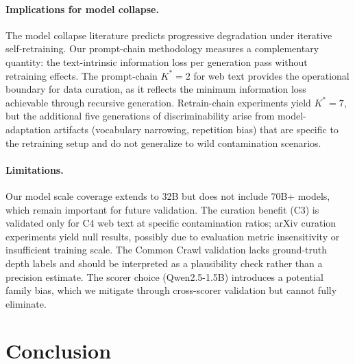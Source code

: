 \documentclass[11pt,a4paper]{article}
\newcommand{\kstar}{K^{*}}
\begin{document}
\paragraph{Implications for model collapse.}
The model collapse literature predicts progressive degradation under iterative self-retraining.
Our prompt-chain methodology measures a complementary quantity: the text-intrinsic information loss per generation pass without retraining effects.
The prompt-chain $\kstar\!=\!2$ for web text provides the operational boundary for data curation, as it reflects the minimum information loss achievable through recursive generation.
Retrain-chain experiments yield $\kstar\!=\!7$, but the additional five generations of discriminability arise from model-adaptation artifacts (vocabulary narrowing, repetition bias) that are specific to the retraining setup and do not generalize to wild contamination scenarios.

\paragraph{Limitations.}
Our model scale coverage extends to 32B but does not include 70B+ models, which remain important for future validation.
The curation benefit (C3) is validated only for C4 web text at specific contamination ratios; arXiv curation experiments yield null results, possibly due to evaluation metric insensitivity or insufficient training scale.
The Common Crawl validation lacks ground-truth depth labels and should be interpreted as a plausibility check rather than a precision estimate.
The scorer choice (Qwen2.5-1.5B) introduces a potential family bias, which we mitigate through cross-scorer validation but cannot fully eliminate.

\section{Conclusion}
\end{document}
